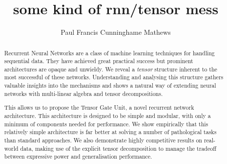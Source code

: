 \documentclass[11pt, a4paper, twoside, openright]{report}
\title{some kind of rnn/tensor mess}
\author{Paul Francis Cunninghame Mathews}
\date{}
\begin{document}
\frontmatter



\begin{abstract}

Recurrent Neural Networks are a class of machine learning techniques for handling sequential
data. They have achieved great practical success but
prominent architectures are opaque and unwieldy. We reveal a \emph{tensor} structure inherent
to the most successful of these networks. 
Understanding and analysing this structure gathers valuable insights into the mechanisms
and shows a natural way of extending neural networks with multi-linear algebra and tensor
decompositions.

This allows us to propose the Tensor Gate Unit,
a novel recurrent network architecture. This architecture is designed to be simple
and modular, with only a minimum of components needed for performance.
We show empirically that this relatively simple architecture is far better at solving
a number of pathological tasks than standard approaches. We also demonstrate highly
competitive results on real-world data, making use of the explicit tensor decomposition to
manage the tradeoff between expressive power and generalisation performance.

\end{abstract}


\maketitle



\tableofcontents



\mainmatter









\appendix



\backmatter



%
%
%
\printbibliography
\end{document}
